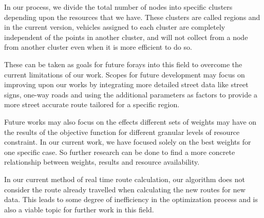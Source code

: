\documentclass[12pt]{article}
\begin{document}
In our process, we divide the total number of nodes into specific clusters depending upon the resources that we have. These clusters are called regions and in the current version, vehicles assigned to each cluster are completely independent of the points in another cluster, and will not collect from a node from another cluster even when it is more efficient to do so. 

These can be taken as goals for future forays into this field to overcome the current limitations of our work. Scopes for future development may focus on improving upon our works by integrating more detailed street data like street signs, one-way roads and using the additional parameters as factors to provide a more street accurate route tailored for a specific region.

Future works may also focus on the effects different sets of weights may have on the results of the objective function for different granular levels of resource constraint. In our current work, we have focused solely on the best weights for one specific case. So further research can be done to find a more concrete relationship between weights, results and resource availability. 

In our current method of real time route calculation, our algorithm does not consider the route already travelled when calculating the new routes for new data. This leads to some degree of inefficiency in the optimization process and is also a viable topic for further work in this field.



\end{document}
